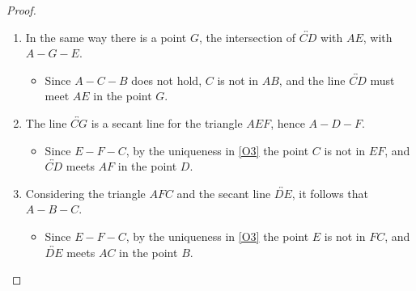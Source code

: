 \documentclass[11pt]{amsart}
\theoremstyle{definition}
\theoremstyle{remark}
\begin{document}
\begin{proof}
\begin{enumerate}[label=(\arabic*)]
\begin{itemize}
\end{itemize}
\item In the same way there is a point $G$, the intersection of $\overleftrightarrow{CD}$ with $AE$, with $A-G-E$.
\begin{itemize}
  \item Since $A-C-B$ does not hold, $C$ is not in $AB$, and the line $\overleftrightarrow{CD}$ must meet $AE$ in the point $G$.
\end{itemize}
\item The line $\overleftrightarrow{CG}$ is a secant line for the triangle $AEF$, hence $A-D-F$.
\begin{itemize}
  \item Since $E-F-C$, by the uniqueness in \ref{O3} the point $C$ is not in $EF$, and $\overleftrightarrow{CD}$ meets $AF$ in the point $D$.
\end{itemize}
\item Considering the triangle $AFC$ and the secant line $\overleftrightarrow{DE}$, it follows that $A-B-C$.
\begin{itemize}
  \item Since $E-F-C$, by the uniqueness in \ref{O3} the point $E$ is not in $FC$, and $\overleftrightarrow{DE}$ meets $AC$ in the point $B$.\qedhere
\end{itemize}
\end{enumerate}
\end{proof}
\end{document}
